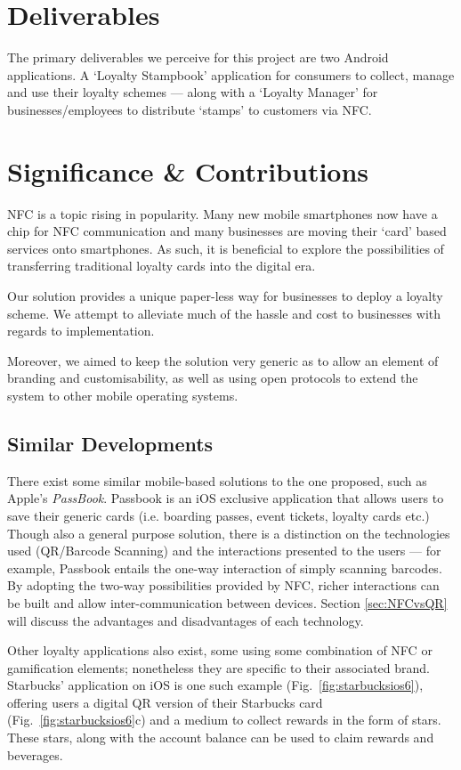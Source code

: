 \section{Deliverables}
The primary deliverables we perceive for this project are two Android applications. A `Loyalty Stampbook' application for consumers to collect, manage and use their loyalty schemes --- along with a `Loyalty Manager' for businesses/employees to distribute `stamps' to customers via NFC.  

\section{Significance \& Contributions}
NFC is a topic rising in popularity. Many new mobile smartphones now have a chip for NFC communication and many businesses are moving their `card' based services onto smartphones. As such, it is beneficial to explore the possibilities of transferring traditional loyalty cards into the digital era. 

Our solution provides a unique paper-less way for businesses to deploy a loyalty scheme. We attempt to alleviate much of the hassle and cost to businesses with regards to implementation.

Moreover, we aimed to keep the solution very generic as to allow an element of branding and customisability, as well as using open protocols to extend the system to other mobile operating systems.   

\subsection{Similar Developments}
There exist some similar mobile-based solutions to the one proposed, such as Apple's \emph{PassBook}. Passbook is an iOS exclusive application that allows users to save their generic cards (i.e. boarding passes, event tickets, loyalty cards etc.) Though also a general purpose solution, there is a distinction on the technologies used (QR/Barcode Scanning) and the interactions presented to the users --- for example, Passbook entails the one-way interaction of simply scanning barcodes. By adopting the two-way possibilities provided by NFC, richer interactions can be built and allow inter-communication between devices. Section \ref{sec:NFCvsQR} will discuss the advantages and disadvantages of each technology.

Other loyalty applications also exist, some using some combination of NFC or gamification elements; nonetheless they are specific to their associated brand. Starbucks' application on iOS is one such example (Fig.~\ref{fig:starbucksios6}), offering users a digital QR version of their Starbucks card (Fig.~\ref{fig:starbucksios6}c) and a medium to collect rewards in the form of stars. These stars, along with the account balance can be used to claim rewards and beverages.

